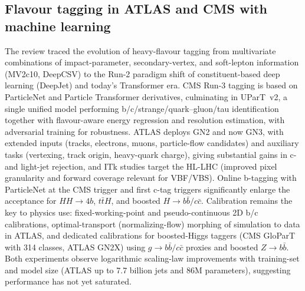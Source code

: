 \subsection{Flavour tagging in ATLAS and CMS with machine learning}
The review traced the evolution of heavy-flavour tagging from multivariate
combinations of impact-parameter, secondary-vertex, and soft-lepton information
(MV2c10, DeepCSV) to the Run-2 paradigm shift of constituent-based deep
learning (DeepJet) and today's Transformer era. CMS Run-3 tagging is based on
ParticleNet and Particle Transformer derivatives, culminating in UParT~v2, a
single unified model performing b/c/strange/quark--gluon/tau identification
together with flavour-aware energy regression and resolution estimation, with
adversarial training for robustness. ATLAS deploys GN2 and now GN3, with
extended inputs (tracks, electrons, muons, particle-flow candidates) and
auxiliary tasks (vertexing, track origin, heavy-quark charge), giving
substantial gains in c- and light-jet rejection, and ITk studies target the
HL-LHC (improved pixel granularity and forward coverage relevant for VBF/VBS).
Online b-tagging with ParticleNet at the CMS trigger and first c-tag triggers
significantly enlarge the acceptance for $HH\to 4b$, $t\bar t H$, and boosted
$H\to b\bar b/c\bar c$. Calibration remains the key to physics use:
fixed-working-point and pseudo-continuous 2D b/c calibrations, optimal-transport
(normalizing-flow) morphing of simulation to data in ATLAS, and dedicated
calibrations for boosted-Higgs taggers (CMS GloParT with 314 classes, ATLAS
GN2X) using $g\to b\bar b/c\bar c$ proxies and boosted $Z\to b\bar b$. Both
experiments observe logarithmic scaling-law improvements with training-set and
model size (ATLAS up to 7.7 billion jets and 86M parameters), suggesting
performance has not yet saturated.
